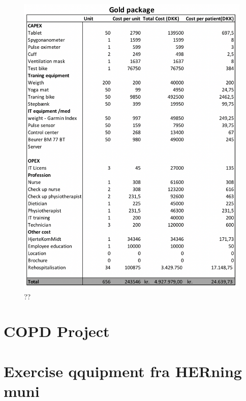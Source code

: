 \begin{figure}[H]
\centering
\includegraphics[width=1\textwidth]{Figure/Gold.png}
\caption{??}
\label{fig: Gold}
\end{figure} 


\chapter{COPD Project}

\chapter{Exercise qquipment fra HERning muni}
